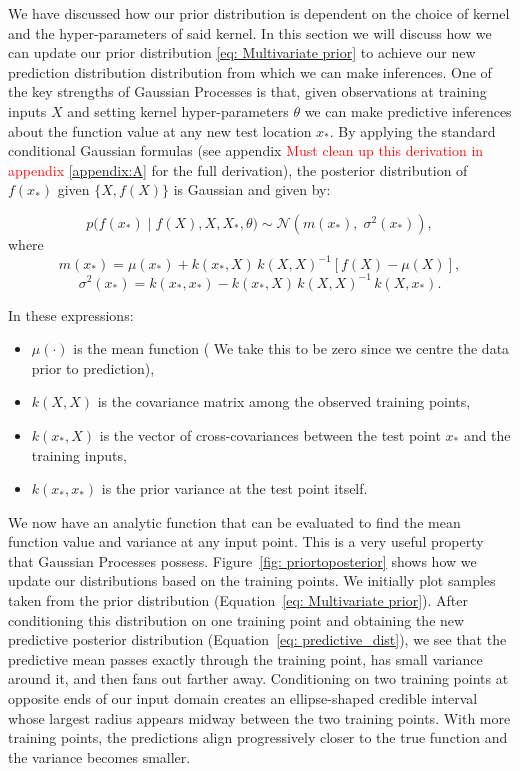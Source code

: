 \documentclass[11pt]{article}
\begin{document}
We have discussed how our prior distribution is dependent on the choice of kernel and the hyper-parameters of said kernel. In this section
we will discuss how we can update our prior distribution \ref{eq: Multivariate prior} to achieve our new prediction distribution distribution from which we can make
inferences. One of the key strengths of Gaussian Processes is that, given observations at training inputs \(X\) and setting kernel hyper-parameters \(\theta\)
we can make predictive inferences about the function value at any new test location \(x_*\).
By applying the standard conditional Gaussian formulas (see appendix \textcolor{red}{Must clean up this derivation in appendix} \ref{appendix:A} for the full derivation),
the posterior distribution of \(f(x_*)\) given \(\{X, f(X)\}\) is Gaussian and given by:

\begin{equation}
p\bigl(f(x_*) \mid f(X), X, X_*,\theta \bigr) \sim \mathcal{N}\!\left(m(x_*),\;\sigma^2(x_*)\right),
\label{eq: predictive_dist}
\end{equation}
\noindent
where
\begin{equation}
m(x_*) = \mu(x_*) + k(x_*, X)\,k(X, X)^{-1}\left[f(X) - \mu(X)\right],
\label{eq: predictive_mean}
\end{equation}
\begin{equation}
\sigma^2(x_*) = k(x_*, x_*) - k(x_*, X)\,k(X, X)^{-1}\,k(X, x_*).
\label{eq: predictive_variance}
\end{equation}

In these expressions:
\begin{itemize}
    \item \( \mu(\cdot) \) is the mean function ( We take this to be zero since we centre the data prior to prediction),
    \item \( k(X, X) \) is the covariance matrix among the observed training points,
    \item \( k(x_*, X) \) is the vector of cross-covariances between the test point \(x_*\) and the training inputs,
    \item \( k(x_*, x_*) \) is the prior variance at the test point itself.
\end{itemize}

\noindent
We now have an analytic function that can be evaluated to find the mean function value and variance at any input point.
This is a very useful property that Gaussian Processes possess. Figure~\ref{fig: priortoposterior} shows how we update our
distributions based on the training points. We initially plot samples taken from the prior distribution (Equation~\ref{eq: Multivariate prior}). 
After conditioning this distribution on one training point and obtaining the new predictive posterior distribution (Equation~\ref{eq: predictive_dist}), 
we see that the predictive mean passes exactly through the training point, has small variance around it, and then fans out farther away. 
Conditioning on two training points at opposite ends of our input domain creates an ellipse-shaped credible interval whose largest radius 
appears midway between the two training points. With more training points, the predictions align progressively closer to the true function 
and the variance becomes smaller.
\end{document}
